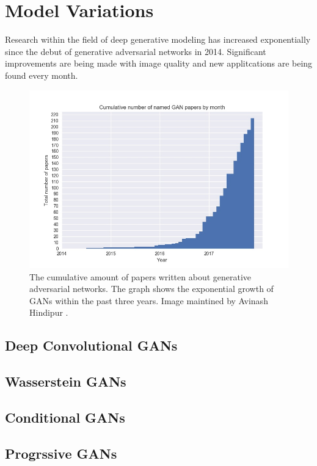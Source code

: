 \documentclass[11pt]{article}
\begin{document}
\section{Model Variations}
Research within the field of deep generative modeling has increased exponentially since the debut of generative adversarial networks in 2014. Significant improvements are being made with image quality and new applitcations are being found every month.

\begin{figure}
\centering
\includegraphics[scale=0.65]{cumulative_gans}
\caption{The cumulative amount of papers written about generative adversarial networks. The graph shows the exponential growth of GANs within the past three years. Image maintined by Avinash Hindipur \citep{November2017GANZoo}.}
\label{fig:Cumulative Number of GAN papers by Month}
\end{figure}

\subsection{Deep Convolutional GANs}
\subsection{Wasserstein GANs}
\subsection{Conditional GANs}
\subsection{Progrssive GANs}
\end{document}
